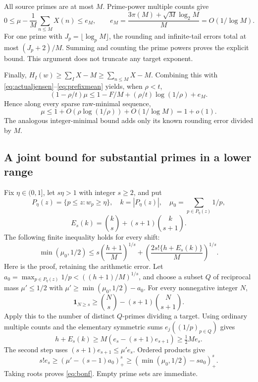 \documentclass[11pt,a4paper]{article}
\theoremstyle{remark}\newtheorem{remark}[theorem]{Remark}
\newcommand{\pos}[1]{(#1)_+}
\newcommand{\one}{\mathbf1}
\begin{document}
All source primes are at most \(M\). Prime-power multiple counts give
\begin{equation}
 0\le\mu-\frac1M\sum_{n\le M}X(n)\le e_M,
 \qquad e_M=\frac{3\pi(M)+\sqrt M\log_2M}{M}=O(1/\log M).
 \label{eq:prefixmean}
\end{equation}
For one prime with \(J_p=\lfloor\log_pM\rfloor\), the rounding and
infinite-tail errors total at most \((J_p+2)/M\). Summing and counting
the prime powers proves the explicit bound. This argument does not
truncate any target exponent.

Finally,
\(H_I(w)\ge\sum_I X-M\ge\sum_{n\le M}X-M\). Combining this with
\eqref{eq:actualjensen}--\eqref{eq:prefixmean} yields, when \(\rho<t\),
\begin{equation}
 (1-\rho/t)\mu\le1-F/M+(\rho/t)\log(1/\rho)+e_M.
 \label{eq:meanbound}
\end{equation}
Hence along every sparse raw-minimal sequence,
\begin{equation}
 \boxed{\quad\mu\le1+O(\rho\log(1/\rho))+O(1/\log M)=1+o(1).\quad}
 \label{eq:sparsemean}
\end{equation}
The analogous integer-minimal bound adds only its known rounding
error divided by \(M\).

\subsection{A joint bound for substantial primes in a lower range}

Fix \(\eta\in(0,1]\), let \(s\eta>1\) with integer \(s\ge2\), and put
\[
 P_\eta(z)=\{p\le z:w_p\ge\eta\},\quad k=|P_\eta(z)|,
 \quad\mu_0=\sum_{p\in P_\eta(z)}1/p,
\]
\[
 E_s(k)=\binom{k}{s}+(s+1)\binom{k}{s+1}.
\]
The following finite inequality holds for every shift:
\begin{equation}
 \min(\mu_0,1/2)\le
 s\left(\frac{h+1}{M}\right)^{1/s}
 +\left(\frac{2s!\{h+E_s(k)\}}M\right)^{1/s}.
 \label{eq:bonf}
\end{equation}
Here is the proof, retaining the arithmetic error. Let
\(a_0=\max_{p\in P_\eta(z)}1/p<((h+1)/M)^{1/s}\), and choose a
subset \(Q\) of reciprocal mass \(\mu'\le1/2\) with
\(\mu'\ge\min(\mu_0,1/2)-a_0\). For every nonnegative integer \(N\),
\[
 \one_{N\ge s}\ge\binom Ns-(s+1)\binom N{s+1}.
\]
Apply this to the number of distinct \(Q\)-primes dividing a target.
Using ordinary multiple counts and the elementary symmetric sums
\(e_j((1/p)_{p\in Q})\) gives
\[
 h+E_s(k)\ge M(e_s-(s+1)e_{s+1})\ge\tfrac12Me_s.
\]
The second step uses \((s+1)e_{s+1}\le\mu'e_s\). Ordered products give
\[
 s!e_s\ge\pos{\mu'-(s-1)a_0}^{s}
 \ge\pos{\min(\mu_0,1/2)-sa_0}^{s}.
\]
Taking roots proves \eqref{eq:bonf}. Empty prime sets are immediate.
\end{document}

